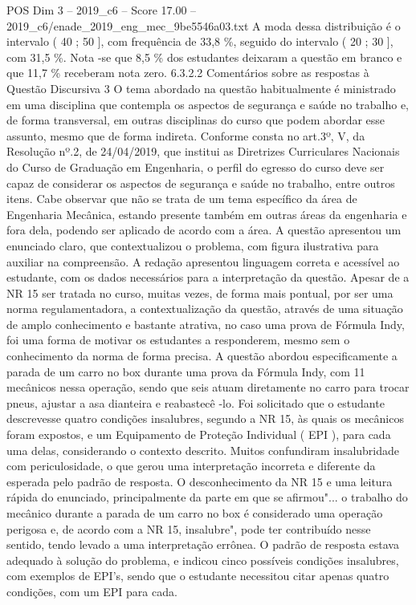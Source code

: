 \begin{textsample}{POS Dim 3 – 2019\_c6 – Score 17.00 – 2019\_c6/enade\_2019\_eng\_mec\_9be5546a03.txt}
A moda dessa distribuição é o intervalo ( 40 ; 50 ], com frequência de 33,8 \%, seguido do intervalo ( 20 ; 30 ], com 31,5 \%.
Nota -se que 8,5 \% dos estudantes deixaram a questão em branco e que 11,7 \% receberam nota zero. 6.3.2.2 Comentários sobre as respostas à Questão Discursiva 3 O tema abordado na questão habitualmente é ministrado em uma disciplina que contempla os aspectos de segurança e saúde no trabalho e, de forma transversal, em outras disciplinas do curso que podem abordar esse assunto, mesmo que de forma indireta.
Conforme consta no art.3º, V, da Resolução nº.2, de 24/04/2019, que institui as Diretrizes Curriculares Nacionais do Curso de Graduação em Engenharia, o perfil do egresso do curso deve ser capaz de considerar os aspectos de segurança e saúde no trabalho, entre outros itens.
Cabe observar que não se trata de um tema específico da área de Engenharia Mecânica, estando presente também em outras áreas da engenharia e fora dela, podendo ser aplicado de acordo com a área.
A questão apresentou um enunciado claro, que contextualizou o problema, com figura ilustrativa para auxiliar na compreensão.
A redação apresentou linguagem correta e acessível ao estudante, com os dados necessários para a interpretação da questão.
Apesar de a NR 15 ser tratada no curso, muitas vezes, de forma mais pontual, por ser uma norma regulamentadora, a contextualização da questão, através de uma situação de amplo conhecimento e bastante atrativa, no caso uma prova de Fórmula Indy, foi uma forma de motivar os estudantes a responderem, mesmo sem o conhecimento da norma de forma precisa.
A questão abordou especificamente a parada de um carro no box durante uma prova da Fórmula Indy, com 11 mecânicos nessa operação, sendo que seis atuam diretamente no carro para trocar pneus, ajustar a asa dianteira e reabastecê -lo.
Foi solicitado que o estudante descrevesse quatro condições insalubres, segundo a NR 15, às quais os mecânicos foram expostos, e um Equipamento de Proteção Individual ( EPI ), para cada uma delas, considerando o contexto descrito.
Muitos confundiram insalubridade com periculosidade, o que gerou uma interpretação incorreta e diferente da esperada pelo padrão de resposta.
O desconhecimento da NR 15 e uma leitura rápida do enunciado, principalmente da parte em que se afirmou"... o trabalho do mecânico durante a parada de um carro no box é considerado uma operação perigosa e, de acordo com a NR 15, insalubre", pode ter contribuído nesse sentido, tendo levado a uma interpretação errônea.
O padrão de resposta estava adequado à solução do problema, e indicou cinco possíveis condições insalubres, com exemplos de EPI’s, sendo que o estudante necessitou citar apenas quatro condições, com um EPI para cada.

\end{textsample}
